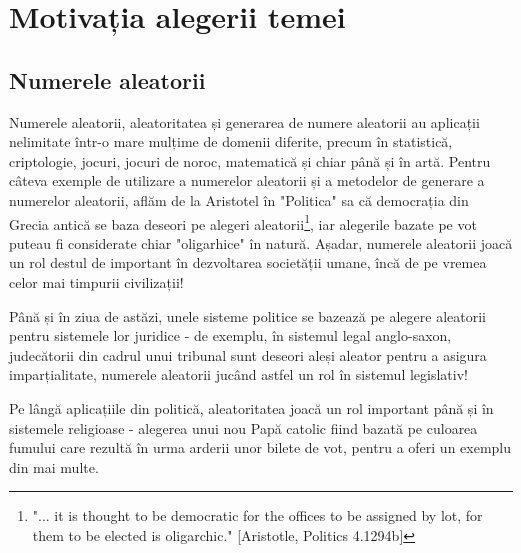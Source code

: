 \iffalse
Introducerea va avea 2–3 pagini care vor conține motivația alegerii temei, relevanța și contextul temei alese, obiectivele generale ale lucrării, metodologia și instrumentele utilizate și o scurtă descriere a structurii lucrării (titlul capitolelor, o scurtă descriere și legătura dintre acestea).

În acest capitol nu se introduc figuri, table sau listing-uri de cod. Pot fi în schimb referite!
\fi
\renewcommand{\thesection}{\Roman{section}}
\renewcommand{\thesubsection}{\thesection.\Roman{subsection}}
\section{Motivația alegerii temei}
\subsection{Numerele aleatorii}
Numerele aleatorii, aleatoritatea și generarea de numere aleatorii au aplicații nelimitate într-o mare mulțime de domenii diferite, precum în statistică, criptologie, jocuri, jocuri de noroc, matematică și chiar până și în artă.
Pentru câteva exemple de utilizare a numerelor aleatorii și a metodelor de generare a numerelor aleatorii, aflăm de la Aristotel în "Politica" sa \cite{book:aristotle:2015} că democrația din Grecia antică se baza deseori pe alegeri aleatorii\footnote{"... it is thought to be democratic for the offices to be assigned by lot, for them to be elected is oligarchic." [Aristotle, Politics 4.1294b]}, iar alegerile bazate pe vot puteau fi considerate chiar "oligarhice" în natură. Așadar, numerele aleatorii joacă un rol destul de important în dezvoltarea societății umane, încă de pe vremea celor mai timpurii civilizații!

Până și în ziua de astăzi, unele sisteme politice se bazează pe alegere aleatorii pentru sistemele lor juridice - de exemplu, în sistemul legal anglo-saxon, judecătorii din cadrul unui tribunal sunt deseori aleși aleator pentru a asigura imparțialitate, numerele aleatorii jucând astfel un rol în sistemul legislativ!

Pe lângă aplicațiile din politică, aleatoritatea joacă un rol important până și în sistemele religioase - alegerea unui nou Papă catolic fiind bazată pe culoarea fumului care rezultă în urma arderii unor bilete de vot, pentru a oferi un exemplu din mai multe.

